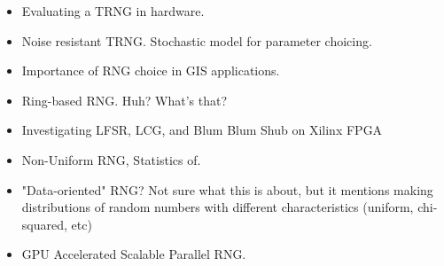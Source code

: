 \documentclass[journal]{IEEEtran}
\begin{document}
\begin{itemize}
\item
\cite{000321520700011n.d.} Evaluating a TRNG in hardware.
\item
\cite{000322026900007n.d.} Noise resistant TRNG. Stochastic model for parameter choicing.
\item
\cite{6082794820110401} Importance of RNG choice in GIS applications.
\item
\cite{6102549620110515} Ring-based RNG. Huh? What's that?
\item
\cite{8288132620110601} Investigating LFSR, LCG, and Blum Blum Shub on 
Xilinx FPGA
\item
\cite{8704557320120101} Non-Uniform RNG, Statistics of.
\item
\cite{8762674520130201} "Data-oriented" RNG? Not sure what this is about, but it mentions 
making distributions of random numbers with different characteristics (uniform, chi-squared, 
etc)
\item
\cite{000315974100018n.d.} GPU Accelerated Scalable Parallel RNG.
\end{itemize}

{}

\end{document}
